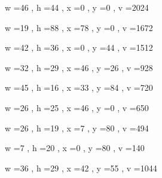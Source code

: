 \documentclass[11pt]{article}
\begin{document}
w =46 , h =44 , x =0 , y =0 , v =2024
\par
w =19 , h =88 , x =78 , y =0 , v =1672
\par
w =42 , h =36 , x =0 , y =44 , v =1512
\par
w =32 , h =29 , x =46 , y =26 , v =928
\par
w =45 , h =16 , x =33 , y =84 , v =720
\par
w =26 , h =25 , x =46 , y =0 , v =650
\par
w =26 , h =19 , x =7 , y =80 , v =494
\par
w =7 , h =20 , x =0 , y =80 , v =140
\par
w =36 , h =29 , x =42 , y =55 , v =1044
\par
\newpage
\end{document}
